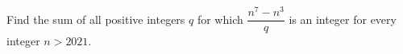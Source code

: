 Find the sum of all positive integers $q$ for which $\dfrac{n^7-n^3}{q}$ is an integer for every integer $n>2021$.
